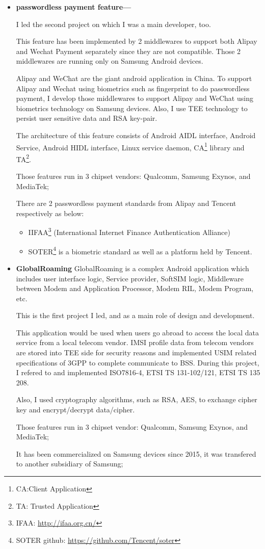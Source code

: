 \documentclass{article}
\begin{document}
\begin{itemize}
\item{\textbf{passwordless payment feature---}}

I led the second project on which I was a main developer, too.

This feature has been implemented by 2 middlewares to support both Alipay and Wechat Payment separately since they are not compatible.
Those 2 middlewares are running only on Samsung Android devices.

Alipay and WeChat are the giant android application in China.
To support Alipay and Wechat using biometrics such as fingerprint to do passwordless payment,
I develop those middlewares to support Alipay and WeChat using biometrics technology on Samsung devices.
Also, I use TEE technology to persist user sensitive data and RSA key-pair.

The architecture of this feature consists of Android AIDL interface, Android Service, Android HIDL interface, Linux service daemon, CA\footnote{CA:Client Application} library
and TA\footnote{TA: Trusted Application}.

Those features run in 3 chipset vendors: Qualcomm, Samsung Exynos, and MediaTek;

There are 2 passwordless payment standards from Alipay and Tencent respectively as below:

\begin{itemize}
\item[1]{IIFAA}\footnote{IFAA: \url{http://ifaa.org.cn/}}
(International Internet Finance Authentication Alliance)

\item[2]{SOTER}\footnote{SOTER github: \url{https://github.com/Tencent/soter}}
is a biometric standard as well as a platform held by Tencent.
\end{itemize}

\item{\textbf{GlobalRoaming}}
GlobalRoaming is a complex Android application which includes user interface logic, Service provider, SoftSIM logic, Middleware between Modem and Application Processor, Modem RIL, Modem Program, etc.

This is the first project I led, and as a main role of design and development.

This application would be used when users go abroad to access the local data service from a local telecom vendor.
IMSI profile data from telecom vendors are stored into TEE side for security reasons and implemented USIM related specifications of 3GPP to complete communicate to BSS.
During this project, I refered to and implemented ISO7816-4, ETSI TS 131-102/121, ETSI TS 135 208.

Also, I used cryptography algorithms, such as RSA, AES, to exchange cipher key and encrypt/decrypt data/cipher.

Those features run in 3 chipset vendor: Qualcomm, Samsung Exynos, and MediaTek;

It has been commercialized on Samsung devices since 2015, it was transfered to another subsidiary of Samsung;


\end{itemize}
\end{document}
